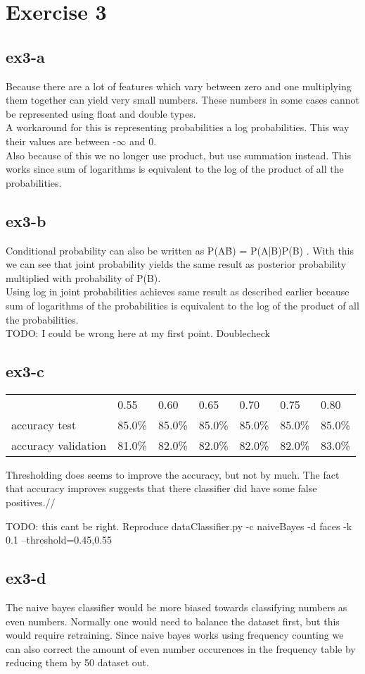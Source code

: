 \section{Exercise 3}
\subsection{ex3-a}
Because there are a lot of features which vary between zero and one multiplying them together can yield very small
numbers. These numbers in some cases cannot be represented using float and double types.\\
A workaround for this is representing probabilities a log probabilities. This way their values are between -$\infty$ and 0.\\
Also because of this we no longer use product, but use summation instead. This works since sum of logarithms is
equivalent to the log of the product of all the probabilities.

\subsection{ex3-b}
Conditional probability can also be written as P(A\^B) = P(A|B)P(B) . With this we can see that joint probability yields
the same result as posterior probability multiplied with probability of P(B). \\
Using log in joint probabilities achieves same result as described earlier because sum of logarithms of the
probabilities is equivalent to the log of the product of all the probabilities.
\\
TODO: I could be wrong here at my first point. Doublecheck

\subsection{ex3-c}
\begin{table}[!htbp]
\begin{tabular}{l|llllll}
                    & 0.55   & 0.60   & 0.65   & 0.70   & 0.75   & 0.80   \\ \cline{2-7}
accuracy test       & 85.0\% & 85.0\% & 85.0\% & 85.0\% & 85.0\% & 85.0\% \\ \cline{2-7}
accuracy validation & 81.0\% & 82.0\% & 82.0\% & 82.0\% & 82.0\% & 83.0\%
\end{tabular}
\end{table}
Thresholding does seems to improve the accuracy, but not by much. The fact that accuracy improves suggests that there
 classifier did have some false positives.//

TODO: this cant be right. Reproduce dataClassifier.py -c naiveBayes -d faces -k 0.1 --threshold=0.45,0.55

\subsection{ex3-d}
The naive bayes classifier would be more biased towards classifying numbers as even numbers. Normally one would need to
balance the dataset first, but this would require retraining. Since naive bayes works using frequency counting we can
also correct the amount of even number occurences in the frequency table by reducing them by 50%
dataset out.